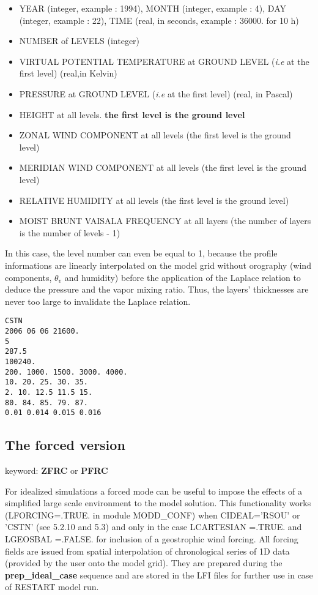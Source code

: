 \begin{itemize}
\item YEAR (integer, example : 1994), MONTH (integer, example : 4), DAY
(integer, example : 22), TIME (real, in seconds, example : 36000. for 10 h)

\item NUMBER of LEVELS (integer)
\item VIRTUAL POTENTIAL TEMPERATURE  at GROUND LEVEL 
({\it i.e} at the first level) (real,in Kelvin)
\item PRESSURE  at GROUND LEVEL ({\it i.e} at the first level) (real, in Pascal)
\item HEIGHT  at all levels. {\bf the first level is the  ground level}
\item ZONAL WIND COMPONENT at all  levels (the first level is the  ground level)
\item MERIDIAN WIND COMPONENT at all  levels (the first level is the  ground level)
\item RELATIVE HUMIDITY at all  levels (the first level is the  ground level)
\item MOIST BRUNT VAISALA FREQUENCY at all layers (the number of layers is the
number of levels - 1)
\end{itemize}

In this case, the level number can even be equal to 1, because the profile
informations are linearly interpolated on the model grid without orography
(wind components, $\theta _v$ and humidity) before the application of the Laplace
relation to deduce the pressure and the vapor mixing ratio. Thus, the
layers' thicknesses are never too large to invalidate the Laplace relation.

\vspace{0.5cm}

\begin{verbatim}
CSTN
2006 06 06 21600.
5
287.5
100240.
200. 1000. 1500. 3000. 4000. 
10. 20. 25. 30. 35.
2. 10. 12.5 11.5 15.
80. 84. 85. 79. 87.
0.01 0.014 0.015 0.016
\end{verbatim}


\subsection{The forced version} \label{ss:forced}

keyword: {\bf ZFRC} or {\bf PFRC}

For idealized simulations a forced mode can be useful to impose the effects of
a simplified large scale environment to the model solution. This functionality
works (LFORCING=.TRUE. in module MODD\_CONF) when CIDEAL='RSOU' or 'CSTN'
(see 5.2.10 and 5.3) and only in the case LCARTESIAN =.TRUE. and
LGEOSBAL =.FALSE. for inclusion of a geostrophic wind forcing.
All forcing fields are  issued from spatial interpolation of chronological series of 1D data (provided by the user onto the model grid). They are prepared during the
{\bf prep\_ideal\_case} sequence and are stored in the LFI files for further use
in case of RESTART model run.

